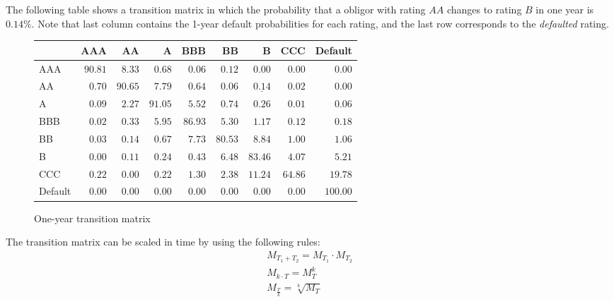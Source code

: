 \documentclass[11pt,fleqn]{book} %
\begin{document}
\begin{example}
	The following table shows a transition matrix in which the probability that 
	a obligor with rating $AA$ changes to rating $B$ in one year is $0.14\%$.
	Note that last column contains the 1-year default probabilities for each 
	rating, and the last row corresponds to the \emph{defaulted} rating.
	
	\begin{figure}[!hb]
		\begin{center}
			\begin{tabular}[]{l|rrrrrrrr}
				        & AAA     & AA      & A       & BBB     & BB      & B                  & CCC     & Default  \\
				\hline
				AAA     & $90.81$ & $8.33$  & $0.68$  & $0.06$  & $0.12$  & $0.00$             & $0.00$  & $0.00$   \\
				AA      & $0.70$  & $90.65$ & $7.79$  & $0.64$  & $0.06$  & $\underline{0.14}$ & $0.02$  & $0.00$   \\
				A       & $0.09$  & $2.27$  & $91.05$ & $5.52$  & $0.74$  & $0.26$             & $0.01$  & $0.06$   \\
				BBB     & $0.02$  & $0.33$  & $5.95$  & $86.93$ & $5.30$  & $1.17$             & $0.12$  & $0.18$   \\
				BB      & $0.03$  & $0.14$  & $0.67$  & $7.73$  & $80.53$ & $8.84$             & $1.00$  & $1.06$   \\
				B       & $0.00$  & $0.11$  & $0.24$  & $0.43$  & $6.48$  & $83.46$            & $4.07$  & $5.21$   \\
				CCC     & $0.22$  & $0.00$  & $0.22$  & $1.30$  & $2.38$  & $11.24$            & $64.86$ & $19.78$  \\
				Default & $0.00$  & $0.00$  & $0.00$  & $0.00$  & $0.00$  & $0.00$             & $0.00$  & $100.00$ \\
			\end{tabular}
			\caption{One-year transition matrix}
			\label{tmatrix1}
		\end{center}
	\end{figure}
\end{example}

\begin{proposition}
	The transition matrix can be scaled in time by using the following rules:
	\begin{equation}
		\label{sttm}
		\begin{array}{l}
			M_{T_1+T_2} = M_{T_1} \cdot M_{T_2} \nonumber \\
			M_{k \cdot T} = M_{T}^k \nonumber             \\
			M_{\frac{T}{k}} = \sqrt[k]{M_{T}} \nonumber   
		\end{array}
	\end{equation}
\end{proposition}
\end{document}
